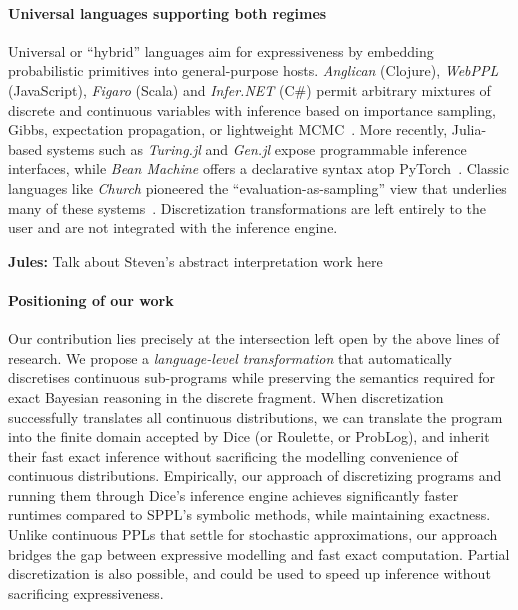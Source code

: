 \documentclass[nonacm,anonymous]{acmart}
\newcommand{\jules}[1]{{\color{blue}\textbf{Jules:} #1}}
\begin{document}
\paragraph{Universal languages supporting both regimes}  
Universal or ``hybrid'' languages aim for expressiveness by embedding probabilistic primitives into general-purpose hosts. \emph{Anglican} (Clojure), \emph{WebPPL} (JavaScript), \emph{Figaro} (Scala) and \emph{Infer.NET} (C\#) permit arbitrary mixtures of discrete and continuous variables with inference based on importance sampling, Gibbs, expectation propagation, or lightweight MCMC~\cite{Tolpin2016Anglican,Goodman2014WebPPL,Pfeffer2009Figaro,Minka2018InferNET}. More recently, Julia-based systems such as \emph{Turing.jl} and \emph{Gen.jl} expose programmable inference interfaces, while \emph{Bean Machine} offers a declarative syntax atop PyTorch~\cite{Ge2018Turing,CusumanoTowner2019Gen,Tehrani2020BeanMachine}. Classic languages like \emph{Church} pioneered the ``evaluation-as-sampling'' view that underlies many of these systems~\cite{Goodman2008Church}. Discretization transformations are left entirely to the user and are not integrated with the inference engine.

\jules{Talk about Steven's abstract interpretation work here}

\paragraph{Positioning of our work}  
Our contribution lies precisely at the intersection left open by the above lines of research. We propose a \emph{language-level transformation} that automatically discretises continuous sub-programs while preserving the semantics required for exact Bayesian reasoning in the discrete fragment. When discretization successfully translates all continuous distributions, we can translate the program into the finite domain accepted by Dice (or Roulette, or ProbLog), and inherit their fast exact inference without sacrificing the modelling convenience of continuous distributions. 
Empirically, our approach of discretizing programs and running them through Dice's inference engine achieves significantly faster runtimes compared to SPPL's symbolic methods, while maintaining exactness. Unlike continuous PPLs that settle for stochastic approximations, our approach bridges the gap between expressive modelling and fast exact computation. Partial discretization is also possible, and could be used to speed up inference without sacrificing expressiveness.
\end{document}
